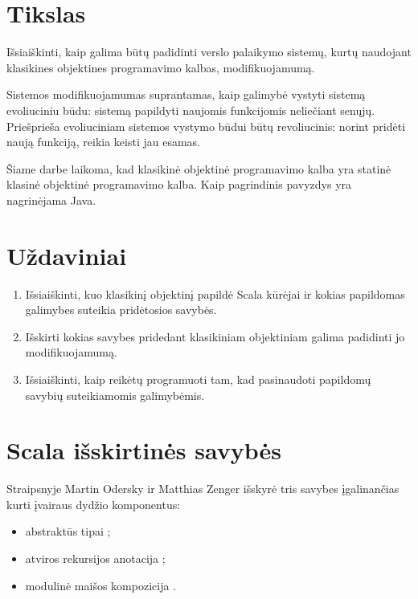 \section{Tikslas}

Išsiaiškinti, kaip galima būtų padidinti verslo palaikymo sistemų, kurtų
naudojant klasikines objektines programavimo kalbas, modifikuojamumą.

Sistemos modifikuojamumas suprantamas, kaip galimybė vystyti sistemą
evoliuciniu būdu: sistemą papildyti naujomis funkcijomis neliečiant
senųjų. Priešprieša evoliuciniam sistemos vystymo būdui būtų
revoliucinis: norint pridėti naują funkciją, reikia keisti jau
esamas.

Šiame darbe laikoma, kad klasikinė objektinė programavimo kalba
yra statinė klasinė objektinė programavimo kalba. Kaip pagrindinis
pavyzdys yra nagrinėjama Java.

\section{Uždaviniai}

\begin{enumerate}
  \item Išsiaiškinti, kuo klasikinį objektinį papildė Scala
    kūrėjai ir kokias papildomas galimybes suteikia pridėtosios
    savybės.
  \item Išskirti kokias savybes pridedant klasikiniam objektiniam
    galima padidinti jo modifikuojamumą.
  \item Išsiaiškinti, kaip reikėtų programuoti tam, kad pasinaudoti
    papildomų savybių suteikiamomis galimybėmis.
\end{enumerate}

\section{Scala išskirtinės savybės}

Straipsnyje \cite{scalable-component-abstractions} Martin Odersky
ir Matthias Zenger išskyrė tris savybes įgalinančias kurti
įvairaus dydžio  komponentus:
\begin{itemize}
  \item abstraktūs tipai ;
  \item atviros rekursijos anotacija ;
  \item modulinė maišos kompozicija .
\end{itemize}

